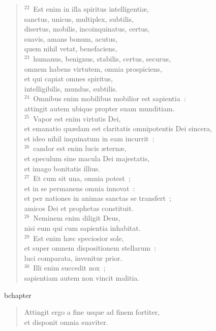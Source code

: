 \begin{flushleft}\begin{verse}${}^{22}$~Est enim in illa spiritus intelligenti\ae ,\\ sanctus, unicus, multiplex, subtilis,\\ disertus, mobilis, incoinquinatus, certus,\\ suavis, amans bonum, acutus,\\ quem nihil vetat, benefaciens,\\
${}^{23}$~humanus, benignus, stabilis, certus, securus,\\ omnem habens virtutem, omnia prospiciens,\\ et qui capiat omnes spiritus,\\ intelligibilis, mundus, subtilis.\\
${}^{24}$~Omnibus enim mobilibus mobilior est sapientia~:\\ attingit autem ubique propter suam munditiam.\\
${}^{25}$~Vapor est enim virtutis Dei,\\ et emanatio qu\ae dam est claritatis omnipotentis Dei sincera,\\ et ideo nihil inquinatum in eam incurrit~:\\
${}^{26}$~candor est enim lucis \ae tern\ae ,\\ et speculum sine macula Dei majestatis,\\ et imago bonitatis illius.\\
${}^{27}$~Et cum sit una, omnia potest~;\\ et in se permanens omnia innovat~:\\ et per nationes in animas sanctas se transfert~;\\ amicos Dei et prophetas constituit.\\
${}^{28}$~Neminem enim diligit Deus,\\ nisi eum qui cum sapientia inhabitat.\\
${}^{29}$~Est enim h\ae c speciosior sole,\\ et super omnem dispositionem stellarum~:\\ luci comparata, invenitur prior.\\
${}^{30}$~Illi enim succedit nox~;\\ sapientiam autem non vincit malitia.\end{verse}\end{flushleft}


bchapter\begin{flushleft}\begin{verse}\vspace{-19pt}Attingit ergo a fine usque ad finem fortiter,\\ et disponit omnia suaviter.\end{verse}\end{flushleft}


